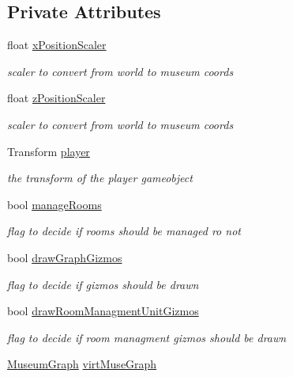 \subsection*{Private Attributes}
\begin{DoxyCompactItemize}
\item 
float \mbox{\hyperlink{class_museum_controller_a48d4258798186a4c7bea39d1f522e4ca}{x\+Position\+Scaler}}
\begin{DoxyCompactList}\small\item\em scaler to convert from world to museum coords \end{DoxyCompactList}\item 
float \mbox{\hyperlink{class_museum_controller_a8d52c606f74d7363018bd4a291b010ec}{z\+Position\+Scaler}}
\begin{DoxyCompactList}\small\item\em scaler to convert from world to museum coords \end{DoxyCompactList}\item 
Transform \mbox{\hyperlink{class_museum_controller_a7741c74482a18bc9ffea21da0f78ec23}{player}}
\begin{DoxyCompactList}\small\item\em the transform of the player gameobject \end{DoxyCompactList}\item 
bool \mbox{\hyperlink{class_museum_controller_a45d6d1ffedb15567ac080d1e47092fdc}{manage\+Rooms}}
\begin{DoxyCompactList}\small\item\em flag to decide if rooms should be managed ro not \end{DoxyCompactList}\item 
bool \mbox{\hyperlink{class_museum_controller_a1a767943d586c25b0fe68bafd35276d5}{draw\+Graph\+Gizmos}}
\begin{DoxyCompactList}\small\item\em flag to decide if gizmos should be drawn \end{DoxyCompactList}\item 
bool \mbox{\hyperlink{class_museum_controller_a4ee410c0d4bf59e30d0374537fc28dcb}{draw\+Room\+Managment\+Unit\+Gizmos}}
\begin{DoxyCompactList}\small\item\em flag to decide if room managment gizmos should be drawn \end{DoxyCompactList}\item 
\mbox{\hyperlink{class_museum_graph}{Museum\+Graph}} \mbox{\hyperlink{class_museum_controller_a57a917ddd05b61fde1cc3bd5ea6dff58}{virt\+Muse\+Graph}}

\end{DoxyCompactItemize}
